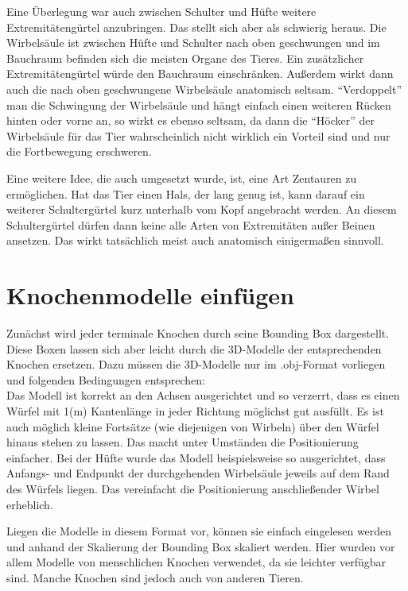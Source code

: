 Eine Überlegung war auch zwischen Schulter und Hüfte weitere Extremitätengürtel anzubringen. Das stellt sich aber als schwierig heraus. Die Wirbelsäule ist zwischen Hüfte und Schulter nach oben geschwungen und im Bauchraum befinden sich die meisten Organe des Tieres. Ein zusätzlicher Extremitätengürtel würde den Bauchraum einschränken. Außerdem wirkt dann auch die nach oben geschwungene Wirbelsäule anatomisch seltsam.
"`Verdoppelt"' man die Schwingung der Wirbelsäule und hängt einfach einen weiteren Rücken hinten oder vorne an, so wirkt es ebenso seltsam, da dann die "`Höcker"' der Wirbelsäule für das Tier wahrscheinlich nicht wirklich ein Vorteil sind und nur die Fortbewegung erschweren.

Eine weitere Idee, die auch umgesetzt wurde, ist, eine Art Zentauren zu ermöglichen. Hat das Tier einen Hals, der lang genug ist, kann darauf ein weiterer Schultergürtel kurz unterhalb vom Kopf angebracht werden. An diesem Schultergürtel dürfen dann keine alle Arten von Extremitäten außer Beinen ansetzen. Das wirkt tatsächlich meist auch anatomisch einigermaßen sinnvoll.


\section{Knochenmodelle einfügen}

Zunächst wird jeder terminale Knochen durch seine Bounding Box dargestellt. Diese Boxen lassen sich aber leicht durch die 3D-Modelle der entsprechenden Knochen ersetzen. Dazu müssen die 3D-Modelle nur im .obj-Format vorliegen und folgenden Bedingungen entsprechen: \\
Das Modell ist korrekt an den Achsen ausgerichtet und so verzerrt, dass es einen Würfel mit 1(m) Kantenlänge in jeder Richtung möglichst gut ausfüllt.
Es ist auch möglich kleine Fortsätze (wie \zb diejenigen von Wirbeln) über den Würfel hinaus stehen zu lassen. Das macht unter Umständen die Positionierung einfacher.
Bei der Hüfte wurde das Modell beispielsweise so ausgerichtet, dass Anfangs- und Endpunkt der durchgehenden Wirbelsäule jeweils auf dem Rand des Würfels liegen. Das vereinfacht die Positionierung anschließender Wirbel erheblich.

Liegen die Modelle in diesem Format vor, können sie einfach eingelesen werden und anhand der Skalierung der Bounding Box skaliert werden.
Hier wurden vor allem Modelle von menschlichen Knochen verwendet, da sie leichter verfügbar sind. Manche Knochen sind jedoch auch von anderen Tieren.

